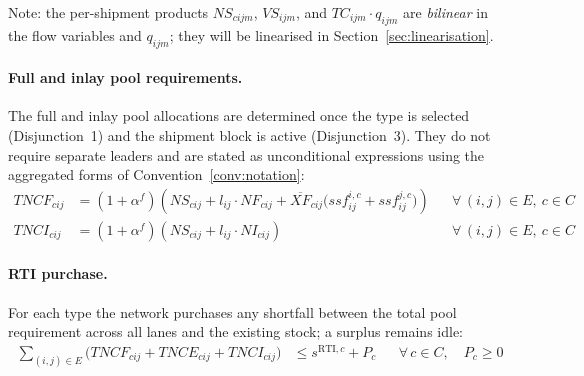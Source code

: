 Note: the per-shipment products $NS_{cijm}$, $VS_{ijm}$, and
$TC_{ijm}\cdot q_{ijm}$ are \emph{bilinear} in the flow variables
and $q_{ijm}$; they will be linearised in
Section~\ref{sec:linearisation}.


\paragraph{Full and inlay pool requirements.}
The full and inlay pool allocations are determined once the type
is selected (Disjunction~1) and the shipment block is active
(Disjunction~3). They do not require separate leaders and are
stated as unconditional expressions using the aggregated forms
of Convention~\ref{conv:notation}:
%
\begin{align}
  TNCF_{cij}
  &= (1+\alpha^{f})\!\left(
       NS_{cij}
       + l_{ij}\cdot NF_{cij}
       + \overline{XF}_{cij}
         \bigl(ssf^{i,c}_{ij}+ssf^{j,c}_{ij}\bigr)
     \right)
  && \forall\,(i,j)\in E,\ c\in C
  \label{eq:pool-full}\\[4pt]
  TNCI_{cij}
  &= (1+\alpha^{f})\!\left(
       NS_{cij}
       + l_{ij}\cdot NI_{cij}
     \right)
  && \forall\,(i,j)\in E,\ c\in C
  \label{eq:pool-inlay}
\end{align}


\paragraph{RTI purchase.}
For each type the network purchases any shortfall between the
total pool requirement across all lanes and the existing stock;
a surplus remains idle:
%
\begin{align}
  \sum_{(i,j)\in E}\!\bigl(
    TNCF_{cij}+TNCE_{cij}+TNCI_{cij}
  \bigr)
  &\leq s^{\text{RTI},c} + P_{c}
  && \forall\, c\in C,\quad P_{c}\geq 0
  \label{eq:purchase}
\end{align}

